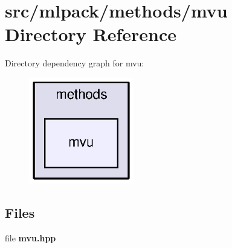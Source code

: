 \section{src/mlpack/methods/mvu Directory Reference}
\label{dir_9eb99e0b60764b3853507c6f78b4dfdc}
Directory dependency graph for mvu\+:
\nopagebreak
\begin{figure}[H]
\begin{center}
\leavevmode
\includegraphics[width=130pt]{dir_9eb99e0b60764b3853507c6f78b4dfdc_dep}
\end{center}
\end{figure}
\subsection*{Files}
\begin{DoxyCompactItemize}
\item 
file {\bf mvu.\+hpp}
\end{DoxyCompactItemize}
